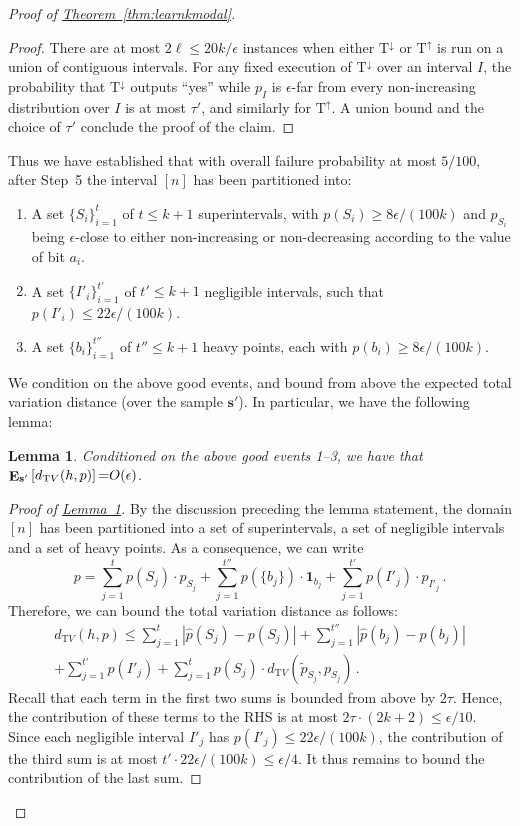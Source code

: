 \documentclass[10pt]{article}
\newtheorem{lemma}[theorem]{Lemma}
\theoremstyle{definition}
\numberwithin{equation}{section}
\newcommand{\expref}[2]{\texorpdfstring{\hyperref[#2]{#1~\ref{#2}}}{#1~\ref{#2}}}
\DeclareMathOperator*{\E}{{\bf E}}
\newcommand{\bm}{\mathbf} %
\newcommand{\dtv}{d_{\mathrm TV}}
\newcommand{\eps}{\epsilon}
\newcommand{\wh}[1]{{\widehat{#1}}}
\newcommand{\TND}{{\mathrm{T^{\uparrow}}}}
\newcommand{\TNI}{{\mathrm{T^{\downarrow}}}}
\begin{document}
\begin{proof}[Proof of \expref{Theorem}{thm:learnkmodal}]
\begin{proof}
There are at most $2\ell \leq 20k/\eps$ instances when either
$\TNI$ or $\TND$ is run on a union of contiguous intervals.
For any fixed execution of $\TNI$ over an interval $I$,
the probability that $\TNI$ outputs ``yes''
while $p_I$ is $\eps$-far from every non-increasing distribution over $I$
is at most $\tau'$, and similarly for $\TND$.  A union bound
and the choice of $\tau'$ conclude the proof of the claim.
\end{proof}

Thus we have established that with overall failure probability at most
$5/100$, after Step~5 the interval $[n]$ has been partitioned into:
\begin{enumerate}
\item A set $\{S_i\}_{i=1}^t$ of $t \leq k+1$ superintervals, with $p(S_i) \geq 8\eps/(100k)$
and $p_{S_i}$ being $\eps$-close to either non-increasing or non-decreasing according to the value of bit $a_i$.


\item  A set  $\{I'_i\}_{i=1}^{t'}$ of $t' \leq k+1$ negligible intervals, such that $p(I'_i) \leq 22 \eps/(100k)$.


\item A set $\{b_i\}_{i=1}^{t''}$ of $t'' \leq k+1$ heavy points, each with $p(b_i) \geq 8 \eps/(100k)$.
\end{enumerate}
\noindent We condition on the above good events, and bound from above the expected total variation distance (over the sample $\mathbf{s}'$). In particular, we have the following lemma:

\begin{lemma} \label{lemma:exp-dtv}
{Conditioned on the above good events 1--3,} we have that $\E_{\mathbf{s}'}\left[\dtv(h,p)\right] {=} O(\eps)$.
\end{lemma}

\begin{proof}[Proof of \expref{Lemma}{lemma:exp-dtv}]
By the discussion preceding the lemma statement,
the domain $[n]$ has been partitioned into a set of superintervals, a set of negligible intervals and a set of heavy points. As a consequence, we can write
$$p  =  \sum_{j=1}^t p(S_j) \cdot p_{S_j} + \sum_{j=1}^{t''} p (\{b_j\}) \cdot {\bm 1}_{b_j} + \sum_{j=1}^{t'} p (I'_j) \cdot p_{I'_j} \,.$$
Therefore, we can bound the total variation distance as follows:
\begin{eqnarray*}
\dtv(h,p) \leq  \sum_{j=1}^{t} |  \wh{p}(S_j)  - p(S_j) | +
\sum_{j=1}^{t''} |  \wh{p}(b_j) - p(b_j)| \\ +
\sum_{j=1}^{t'} p (I'_j) +
\sum_{j=1}^{t} p(S_j) \cdot \dtv (\widetilde{p}_{S_j}, p_{S_j})\,.
\end{eqnarray*}
Recall that each term in the first two sums is bounded from above by $2\tau$. Hence, the contribution of these terms to the RHS is at most $2\tau\cdot (2k+2) \leq \eps/10$. Since each negligible interval $I'_j$ has $p(I'_j) \leq 22\eps/(100k)$, the contribution of the third sum is at most $t' \cdot 22 \eps/(100k) \leq \eps/4$. It thus remains to bound the contribution of the last sum.


\end{proof}
\end{proof}
\end{document}
